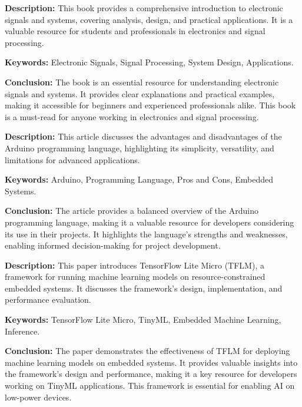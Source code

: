 {
	\textbf{Description:} This book provides a comprehensive introduction to electronic signals and systems, covering analysis, design, and practical applications. It is a valuable resource for students and professionals in electronics and signal processing.
	\newline
	
	\textbf{Keywords:} Electronic Signals, Signal Processing, System Design, Applications.
	
	\newpage
	\textbf{Conclusion:} The book is an essential resource for understanding electronic signals and systems. It provides clear explanations and practical examples, making it accessible for beginners and experienced professionals alike. This book is a must-read for anyone working in electronics and signal processing\cite{BookElectronics:2020}.
}

{
	\textbf{Description:} This article discusses the advantages and disadvantages of the Arduino programming language, highlighting its simplicity, versatility, and limitations for advanced applications.
	\newline
	
	\textbf{Keywords:} Arduino, Programming Language, Pros and Cons, Embedded Systems.
	
	\newpage
	\textbf{Conclusion:} The article provides a balanced overview of the Arduino programming language, making it a valuable resource for developers considering its use in their projects. It highlights the language's strengths and weaknesses, enabling informed decision-making for project development\cite{Chatterjee2024}.
}

{
	\textbf{Description:} This paper introduces TensorFlow Lite Micro (TFLM), a framework for running machine learning models on resource-constrained embedded systems. It discusses the framework's design, implementation, and performance evaluation.
	\newline
	
	\textbf{Keywords:} TensorFlow Lite Micro, TinyML, Embedded Machine Learning, Inference.
	
	\newpage
	\textbf{Conclusion:} The paper demonstrates the effectiveness of TFLM for deploying machine learning models on embedded systems. It provides valuable insights into the framework's design and performance, making it a key resource for developers working on TinyML applications. This framework is essential for enabling AI on low-power devices\cite{David:2021}.
}

